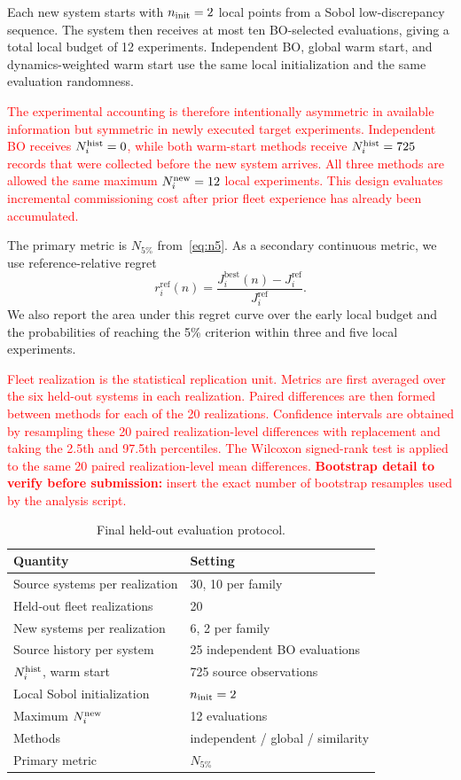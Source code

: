 \documentclass[conference]{IEEEtran}
\newcommand{\rev}[1]{\textcolor{red}{#1}}
\newcommand{\Nfive}{N_{5\%}}
\begin{document}
Each new system starts with $n_{\rm init}=2$ local points from a Sobol low-discrepancy sequence. The system then receives at most ten BO-selected evaluations, giving a total local budget of 12 experiments. Independent BO, global warm start, and dynamics-weighted warm start use the same local initialization and the same evaluation randomness.

\rev{The experimental accounting is therefore intentionally asymmetric in available information but symmetric in newly executed target experiments. Independent BO receives $N_i^{\rm hist}=0$, while both warm-start methods receive $N_i^{\rm hist}=725$ records that were collected before the new system arrives. All three methods are allowed the same maximum $N_i^{\rm new}=12$ local experiments. This design evaluates incremental commissioning cost after prior fleet experience has already been accumulated.}

The primary metric is $\Nfive$ from~\eqref{eq:n5}. As a secondary continuous metric, we use reference-relative regret
\begin{equation}
 r_i^{\mathrm{ref}}(n)=\frac{J_i^{\mathrm{best}}(n)-J_i^{\mathrm{ref}}}{J_i^{\mathrm{ref}}}.
 \label{eq:regretref}
\end{equation}
We also report the area under this regret curve over the early local budget and the probabilities of reaching the 5\% criterion within three and five local experiments.

\rev{Fleet realization is the statistical replication unit. Metrics are first averaged over the six held-out systems in each realization. Paired differences are then formed between methods for each of the 20 realizations. Confidence intervals are obtained by resampling these 20 paired realization-level differences with replacement and taking the 2.5th and 97.5th percentiles. The Wilcoxon signed-rank test is applied to the same 20 paired realization-level mean differences. \textbf{Bootstrap detail to verify before submission:} insert the exact number of bootstrap resamples used by the analysis script.}

\begin{table}[t]
\centering
\caption{Final held-out evaluation protocol.}
\label{tab:protocol}
\scriptsize
\begin{tabular}{@{}ll@{}}
\toprule
Quantity & Setting\\
\midrule
Source systems per realization & 30, 10 per family\\
Held-out fleet realizations & 20\\
New systems per realization & 6, 2 per family\\
Source history per system & 25 independent BO evaluations\\
$N_i^{\rm hist}$, warm start & 725 source observations\\
Local Sobol initialization & $n_{\rm init}=2$\\
Maximum $N_i^{\rm new}$ & 12 evaluations\\
Methods & independent / global / similarity\\
Primary metric & $\Nfive$\\
\bottomrule
\end{tabular}
\end{table}
\end{document}
